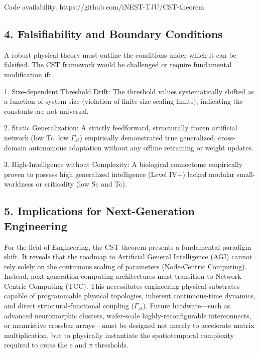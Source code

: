 \documentclass[a4paper,12pt]{article}
\begin{document}
Code availability. https://github.com/iNEST-TJU/CST-theorem



\subsection{4. Falsifiability and Boundary Conditions}

A robust physical theory must outline the conditions under which it can be falsified. The CST framework would be challenged or require fundamental modification if:


1. Size-dependent Threshold Drift: The threshold values systematically shifted as a function of system size (violation of finite-size scaling limits), indicating the constants are not universal.


2. Static Generalization: A strictly feedforward, structurally frozen artificial network (low Tc, low $\Gamma_{st}$) empirically demonstrated true generalized, cross-domain autonomous adaptation without any offline retraining or weight updates.


3. High-Intelligence without Complexity: A biological connectome empirically proven to possess high generalized intelligence (Level IV+) lacked modular small-worldness or criticality (low Sc and Tc).



\subsection{5. Implications for Next-Generation Engineering}

For the field of Engineering, the CST theorem presents a fundamental paradigm shift. It reveals that the roadmap to Artificial General Intelligence (AGI) cannot rely solely on the continuous scaling of parameters (Node-Centric Computing). Instead, next-generation computing architectures must transition to Network-Centric Computing (TCC). This necessitates engineering physical substrates capable of programmable physical topologies, inherent continuous-time dynamics, and direct structural-functional coupling ($\Gamma_{st}$). Future hardware---such as advanced neuromorphic clusters, wafer-scale highly-reconfigurable interconnects, or memristive crossbar arrays---must be designed not merely to accelerate matrix multiplication, but to physically instantiate the spatiotemporal complexity required to cross the e and $\pi$ thresholds.
\end{document}
